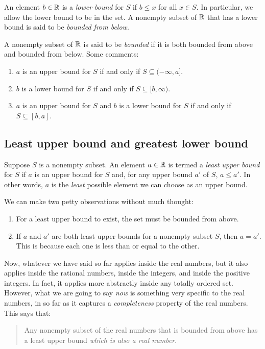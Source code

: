 \documentclass{amsart}
\begin{document}
An element $b \in \mathbb{R}$ is a {\em lower bound} for $S$ if $b \le x$ for
all $x \in S$. In particular, we allow the lower bound to be in the
set. A nonempty subset of $\mathbb{R}$ that has a lower bound is said to be
{\em bounded from below}.

A nonempty subset of $\mathbb{R}$ is said to be {\em bounded} if it is both
bounded from above and bounded from below. Some comments:

\begin{enumerate}
\item $a$ is an upper bound for $S$ if and only if $S \subseteq
  (-\infty,a]$.
\item $b$ is a lower bound for $S$ if and only if $S \subseteq [b,\infty)$.
\item $a$ is an upper bound for $S$ and $b$ is a lower bound for $S$
  if and only if $S \subseteq [b,a]$.
\end{enumerate}

\subsection{Least upper bound and greatest lower bound}

Suppose $S$ is a nonempty subset. An element $a \in \mathbb{R}$ is termed a
{\em least upper bound} for $S$ if $a$ is an upper bound for $S$ and,
for any upper bound $a'$ of $S$, $a \le a'$. In other words, $a$ is
the {\em least} possible element we can choose as an upper bound.

We can make two petty observations without much thought:

\begin{enumerate}
\item For a least upper bound to exist, the set must be bounded from
  above.
\item If $a$ and $a'$ are both least upper bounds for a nonempty
  subset $S$, then $a = a'$. This is because each one is less than or
  equal to the other.
\end{enumerate}

Now, whatever we have said so far applies inside the real numbers, but
it also applies inside the rational numbers, inside the integers, and
inside the positive integers. In fact, it applies more abstractly
inside any totally ordered set. However, what we are going to say {\em
now} is something very specific to the real numbers, in so far as it
captures a {\em completeness} property of the real numbers. This says that:

\begin{quote}
  Any nonempty subset of the real numbers that is bounded from above
  has a least upper bound {\em which is also a real number}.
\end{quote}
\end{document}
